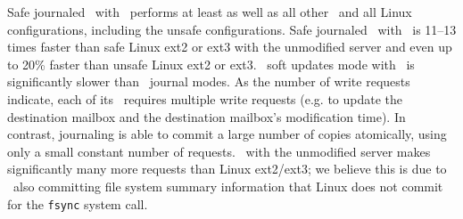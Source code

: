 Safe journaled \Kudos\ with \patchgroups\ performs at least as well as
all other \Kudos\ and all Linux configurations, including the unsafe
configurations. Safe journaled \Kudos\ with \patchgroups\ is 11--13
times faster than safe Linux ext2 or ext3 with the unmodified server
and even up to 20\% faster than unsafe Linux ext2 or ext3.
%
\Kudos\ soft updates mode with \patchgroups\ is significantly slower
than \Kudos\ journal modes. As the number of write requests indicate,
each of its \patchgroups\ requires multiple write requests (e.g. to
update the destination mailbox and the destination mailbox's
modification time). In contrast, journaling is able to commit a large
number of copies atomically, using only a small constant number of
requests.
%
\Kudos\ with the unmodified server makes significantly many more
requests than Linux ext2/ext3; we believe this is due to \Kudos\ also
committing file system summary information that Linux does not commit
for the \texttt{fsync} system call.
%

